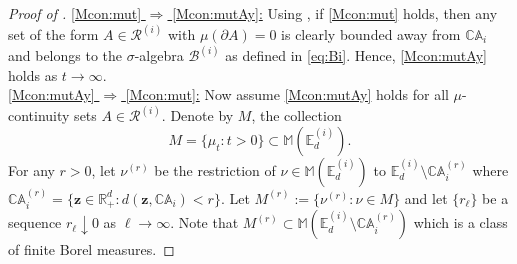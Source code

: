 \documentclass[aos]{imsart}
\numberwithin{equation}{section}
\theoremstyle{plain} %
\theoremstyle{remark}
\newcommand{\E}{\mathbb{E}}
\newcommand{\M}{\mathbb{M}}
\newcommand{\R}{\mathbb{R}}
\def\bCA{\mathbb{CA}}
\def\cB{\mathcal{B}}
\def\cR{\mathcal{R}}
\def\bz{\boldsymbol z}
\begin{document}
\begin{proof}[Proof of ]
\underline{\eqref{Mcon:mut} $\Rightarrow$  \eqref{Mcon:mutAy}:} Using \cite[Theorem 2.1]{lindskog:resnick:roy:2014},  if \eqref{Mcon:mut} holds, then any set of the form $A\in \cR^{(i)}$ with $\mu(\partial A)=0$ is clearly bounded away from $\bCA_i$ and belongs to the $\sigma$-algebra $\cB^{(i)}$ as defined in \eqref{eq:Bi}. Hence, \eqref{Mcon:mutAy} holds as $t\to\infty$.\\
 \underline{\eqref{Mcon:mutAy} $\Rightarrow$  \eqref{Mcon:mut}:}  Now assume  \eqref{Mcon:mutAy}  holds for all $\mu$-continuity sets $A\in \cR^{(i)}$.  Denote by $M$, the collection $$M=\{\mu_t: t>0\}\subset \M(\E_d^{(i)}).$$ For any $r>0$, let $\nu^{(r)}$ be the restriction of   $\nu\in \M(\E_d^{(i)})$ to $\E_d^{(i)}\setminus \bCA_i^{(r)}$ where $\bCA_i^{(r)}=\{\bz\in \R_+^d: d(\bz,\bCA_i)<r\}$. Let $M^{(r)} := \{\nu^{(r)}: \nu \in M\}$ and let $\{r_{\ell}\}$ be a sequence $r_{\ell}\downarrow 0$ as $\ell\to \infty$. Note that $M^{(r)} \subset \M(\E_d^{(i)}\setminus \bCA_i^{(r)})$ which is a class of finite Borel measures.


\end{proof}
\end{document}
